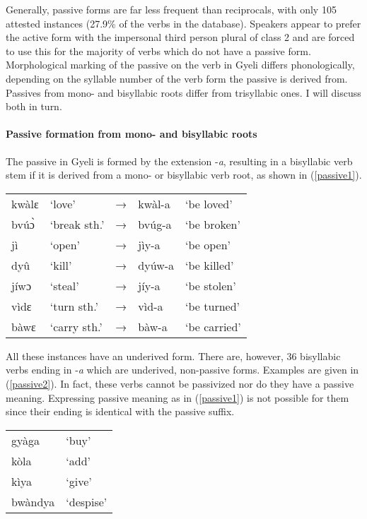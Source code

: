 Generally, passive forms are far less frequent than reciprocals, with only 105 attested instances (27.9\% of the verbs in the database). Speakers appear to prefer the active form with the impersonal third person plural of class 2 and are forced to use this for the majority of verbs which do not have a passive form.  Morphological marking of the passive on the verb in Gyeli differs phonologically, depending on the syllable number of the verb form the passive is derived from. Passives from mono- and bisyllabic roots differ from trisyllabic ones. I will discuss both in turn.

\paragraph{Passive formation from mono- and bisyllabic roots} The passive in Gyeli is formed by the extension -{\itshape a}, resulting in a bisyllabic verb stem if it is derived from a mono- or bisyllabic verb root, as shown in (\ref{passive1}).


\begin{exe} \ex \label{passive1}
\begin{tabular}{lllll}
kwàlɛ & `love' & → & kwàl-a & `be loved' \\
bvúɔ̀ & `break sth.' & → & bvúg-a & `be broken' \\
jì & `open' & → & jìy-a & `be open' \\
dyû & `kill' & → & dyúw-a & `be killed' \\
jíwɔ & `steal' & → & jíy-a & `be stolen' \\
vìdɛ & `turn sth.' & → & vìd-a & `be turned' \\
bàwɛ & `carry sth.' & → &  bàw-a & `be carried' \\
\end{tabular}
\end{exe} 


All these instances have an underived form. There are, however, 36 bisyllabic verbs ending in -{\itshape a} which are underived, non-passive forms. Examples are given in (\ref{passive2}). In fact, these verbs cannot be passivized nor do they have a passive meaning. Expressing passive meaning as in (\ref{passive1}) is not possible for them since their ending is identical with the passive suffix.


\begin{exe} \ex \label{passive2}
\begin{tabular}{ll}
gyàga & `buy'  \\
kòla & `add'  \\
kìya & `give'  \\
bwàndya & `despise' \\
\end{tabular}
\end{exe} 

